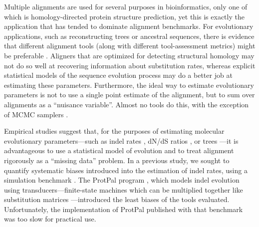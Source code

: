 \documentclass{bioinfo}
\begin{document}
Multiple alignments are used for several purposes in bioinformatics,
only one of which is homology-directed protein structure prediction,
yet this is exactly the application that has tended to dominate alignment benchmarks.
For evolutionary applications, such as reconstructing trees or ancestral sequences,
there is evidence that
different alignment tools (along with different tool-assessment metrics) might be preferable \citep{LoytynojaGoldman2008,Westesson2012-zg}.
Aligners that are optimized for detecting structural homology may not do so well at recovering information about substitution rates,
whereas explicit statistical models of the sequence evolution process may do a better job at estimating these parameters.
Furthermore, the ideal way to estimate evolutionary parameters is not to use a single point estimate of the alignment, but to sum over alignments as a ``nuisance variable''.
Almost no tools do this, with the exception of MCMC samplers \citep{WestessonBarquistHolmes2012,Redelings2014}.

Empirical studies suggest that, for the purposes of estimating
molecular evolutionary parameters---such as indel rates \citep{Westesson2012-zg},
dN/dS ratios \citep{Redelings2014},
or trees \citep{LoytynojaGoldman2008}---it is advantageous to use a statistical model of evolution
and to treat alignment rigorously as a ``missing data'' problem.
%
% 
In a previous study, we sought to quantify systematic biases introduced into the
estimation of indel rates, using a simulation benchmark \citep{Westesson2012-zg}.
The ProtPal program \citep{Westesson2012-zg}, which models indel evolution using 
transducers---finite-state machines which can be multiplied together like substitution matrices \citep{BouchardCote2013}---introduced
the least biases of the tools evaluated.
Unfortunately, the implementation of ProtPal published with that benchmark was too slow
for practical use.
\end{document}
